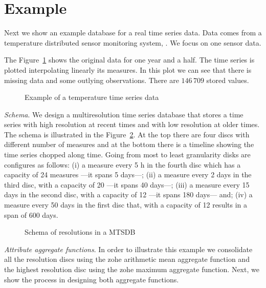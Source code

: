 \section{Example}
\label{sec:example}

Next we show an example database for a real time series data.  Data
comes from a temperature distributed sensor monitoring system,
\cite{alippi10}. We focus on one sensor data.

The Figure~\ref{fig:exemple:original} shows the original data for one
year and a half.  The time series is plotted interpolating linearly
its measures. In this plot we can see that there is missing data and
some outlying observations. There are $146\,709$ stored values.

\begin{figure}[tp]
  \centering
  
  \caption{Example of a temperature time series data}
  \label{fig:exemple:original}
\end{figure}

\emph{Schema}. We design a multiresolution time series database that
stores a time series with high resolution at recent times and with low
resolution at older times. The schema is illustrated in the
Figure~\ref{fig:exemple:window}. At the top there are four discs with
different number of measures and at the bottom there is a timeline
showing the time series chopped along time. Going from most to least
granularity disks are configures as follows: (i) a measure every 5 h
in the fourth disc which has a capacity of 24 measures ---it spans 5
days---; (ii) a measure every 2 days in the third disc, with a
capacity of 20 ---it spans 40 days---; (iii) a measure every 15 days
in the second disc, with a capacity of 12 ---it spans 180 days--- and;
(iv) a measure every 50 days in the first disc that, with a capacity
of 12 results in a span of 600 days.

\begin{figure}[tp]
  \centering
  \setlength{\unitlength}{1.3mm}
  
  \caption{Schema of resolutions in a MTSDB}
  \label{fig:exemple:window}
\end{figure}

\emph{Attribute aggregate functions}.  In order to illustrate this
example we consolidate all the resolution discs using the zohe
arithmetic mean aggregate function and the highest resolution disc
using the zohe maximum aggregate function. Next, we show the process
in designing both aggregate functions.

